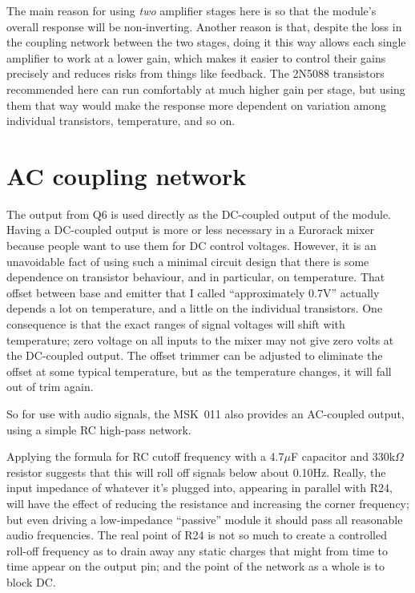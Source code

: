 The main reason for using \emph{two} amplifier stages here is so that the
module's overall response will be non-inverting.  Another reason is that,
despite the loss in the coupling network between the two stages, doing it
this way allows each single amplifier to work at a lower gain, which makes
it easier to control their gains precisely and reduces risks from things
like feedback.  The 2N5088 transistors recommended here can run comfortably
at much higher gain per stage, but using them that way would make the
response more dependent on variation among individual transistors,
temperature, and so on.

\section{AC coupling network}

The output from Q6 is used directly as the DC-coupled output of the module. 
Having a DC-coupled output is more or less necessary in a Eurorack mixer
because people want to use them for DC control voltages.  However, it is an
unavoidable fact of using such a minimal circuit design that there is some
dependence on transistor behaviour, and in particular, on temperature.  That
offset between base and emitter that I called ``approximately 0.7V''
actually depends a lot on temperature, and a little on the individual
transistors.  One consequence is that the exact ranges of signal voltages
will shift with temperature; zero voltage on all inputs to the mixer may not
give zero volts at the DC-coupled output.  The offset trimmer can be
adjusted to eliminate the offset at some typical temperature, but as the
temperature changes, it will fall out of trim again.

So for use with audio signals, the MSK~011 also provides an AC-coupled
output, using a simple RC high-pass network.

{\centering\par}

Applying the formula for RC cutoff frequency with a 4.7$\mu$F capacitor and
330k$\Omega$ resistor suggests that this will roll off signals below about
0.10Hz.  Really, the input impedance of whatever it's plugged into,
appearing in parallel with R24, will have the effect of reducing the
resistance and increasing the corner frequency; but even driving a
low-impedance ``passive'' module it should pass all reasonable audio
frequencies.  The real point of R24 is not so much to create a controlled
roll-off frequency as to drain away any static charges that might from time
to time appear on the output pin; and the point of the network as a whole is
to block DC.
